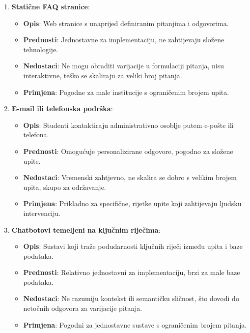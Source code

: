 \begin{enumerate}
   \item \textbf{Statične FAQ stranice}:
   \begin{itemize}
       \item \textbf{Opis}: Web stranice s unaprijed definiranim pitanjima i odgovorima.
       \item \textbf{Prednosti}: Jednostavne za implementaciju, ne zahtijevaju složene tehnologije.
       \item \textbf{Nedostaci}: Ne mogu obraditi varijacije u formulaciji pitanja, nisu interaktivne, teško se skaliraju za veliki broj pitanja.
       \item \textbf{Primjena}: Pogodne za male institucije s ograničenim brojem upita.
   \end{itemize}
   
   \item \textbf{E-mail ili telefonska podrška}:
   \begin{itemize}
       \item \textbf{Opis}: Studenti kontaktiraju administrativno osoblje putem e-pošte ili telefona.
       \item \textbf{Prednosti}: Omogućuje personalizirane odgovore, pogodno za složene upite.
       \item \textbf{Nedostaci}: Vremenski zahtjevno, ne skalira se dobro s velikim brojem upita, skupo za održavanje.
       \item \textbf{Primjena}: Prikladno za specifične, rijetke upite koji zahtijevaju ljudsku intervenciju.
   \end{itemize}
   
   \item \textbf{Chatbotovi temeljeni na ključnim riječima}:
   \begin{itemize}
       \item \textbf{Opis}: Sustavi koji traže podudarnosti ključnih riječi između upita i baze podataka.
       \item \textbf{Prednosti}: Relativno jednostavni za implementaciju, brzi za male baze podataka.
       \item \textbf{Nedostaci}: Ne razumiju kontekst ili semantičku sličnost, što dovodi do netočnih odgovora za varijacije pitanja.
       \item \textbf{Primjena}: Pogodni za jednostavne sustave s ograničenim brojem pitanja.
   \end{itemize}
   

\end{enumerate}
